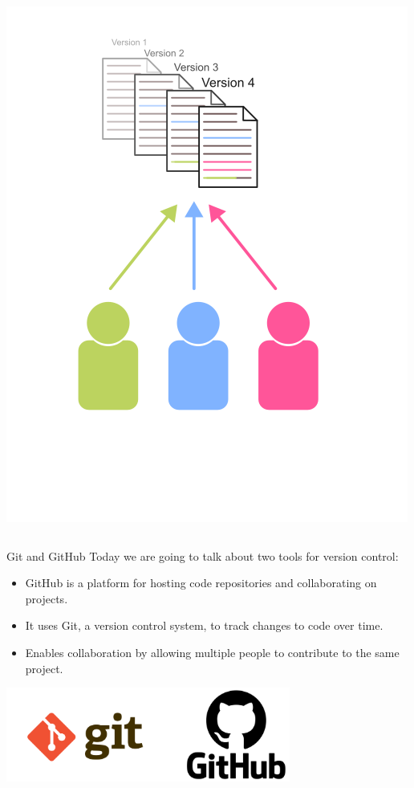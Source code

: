 \documentclass[9pt, aspectratio=169]{beamer}
\begin{document}
\begin{frame}
\begin{columns}[T]
\begin{column}{.5\textwidth}
            \includegraphics[width=.7\textwidth]{version_control.png}
        \end{column}
    \end{columns}
\end{frame}

\begin{frame}{Git and GitHub}
    Today we are going to talk about two tools for version control:

    \begin{itemize}
        \item GitHub is a platform for hosting code repositories and collaborating on projects.
        \item It uses Git, a version control system, to track changes to code over time.
        \item Enables collaboration by allowing multiple people to contribute to the same project.
    \end{itemize}
    \begin{center}
        \includegraphics[width=0.7\textwidth]{git-github-logo.png}
    \end{center}
\end{frame}
\end{document}
